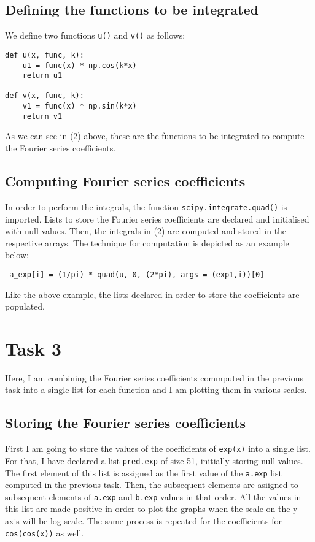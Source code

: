 \documentclass[11pt, a4paper]{article}
\begin{document}
\subsection{Defining the functions to be integrated}
We define two functions \texttt{u()} and \texttt{v()} as follows:
\begin{verbatim}
def u(x, func, k):
    u1 = func(x) * np.cos(k*x)
    return u1

def v(x, func, k):
    v1 = func(x) * np.sin(k*x)
    return v1
\end{verbatim}
As we can see in (2) above, these are the functions to be integrated to compute the Fourier series coefficients.

\subsection{Computing Fourier series coefficients}
In order to perform the integrals, the function \texttt{scipy.integrate.quad()} is imported. Lists to store the Fourier series coefficients are declared and initialised with null values. Then, the integrals in  (2) are computed and stored in the respective arrays. The technique for computation is depicted as an example below:
\begin{verbatim}
 a_exp[i] = (1/pi) * quad(u, 0, (2*pi), args = (exp1,i))[0]
\end{verbatim}
Like the above example, the lists declared in order to store the coefficients are populated.

\section{Task 3}
Here, I am combining the Fourier series coefficients commputed in the previous task into a single list for each function and I am plotting them in various scales.

\subsection{Storing the Fourier series coefficients}
First I am going to store the values of the coefficients of \texttt{exp(x)} into a single list. For that, I have declared a list \texttt{pred.exp} of size 51, initially storing null values. The first element of this list is assigned as the first value of the \texttt{a.exp} list computed in the previous task. Then, the subsequent elements are asiigned to subsequent elements of \texttt{a.exp} and \texttt{b.exp} values in that order. All the values in this list are made positive in order to plot the graphs when the scale on the y-axis will be log scale. The same process is repeated for the coefficients for \texttt{cos(cos(x))} as well.
\end{document}
